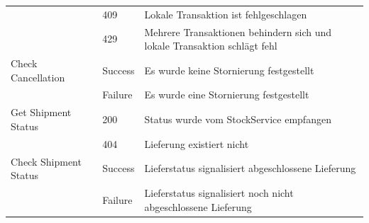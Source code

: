 \begin{center}
\begin{tabular}[h]{|p{3cm}|p{1.5cm}|p{11cm}|}
							& 409		& Lokale Transaktion ist fehlgeschlagen \\
							& 429 		& Mehrere Transaktionen behindern sich und lokale Transaktion schlägt fehl \\ \hline
		Check Cancellation 	& Success	& Es wurde keine Stornierung festgestellt \\
							& Failure	& Es wurde eine Stornierung festgestellt \\ \hline
		Get Shipment Status	& 200 		& Status wurde vom StockService empfangen \\
							& 404		& Lieferung existiert nicht \\ \hline
		Check Shipment Status& Success	& Lieferstatus signalisiert abgeschlossene Lieferung \\
							& Failure 	& Lieferstatus signalisiert noch nicht abgeschlossene Lieferung \\ \hline
	\end{tabular}
\end{center}
\FloatBarrier

